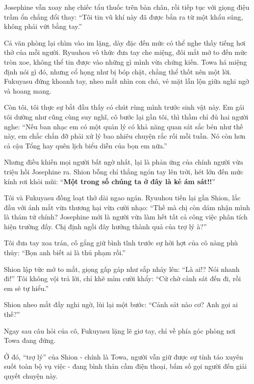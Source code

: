 \documentclass[../main.tex]{subfiles}
\begin{document}
Josephine vẫn xoay nhẹ chiếc tẩu thuốc trên bàn chân, rồi tiếp tục với giọng điệu trầm ổn chẳng đổi thay: ``Tôi tin vũ khí này đã được bắn ra từ một khẩu súng, không phải vứt bằng tay.''

Cả văn phòng lại chìm vào im lặng, dày đặc đến mức có thể nghe thấy tiếng hơi thở của mỗi người. Ryuuhou vô thức đưa tay che miệng, đôi mắt mở to đến mức tròn xoe, không thể tin được vào những gì mình vừa chứng kiến. Towa há miệng định nói gì đó, nhưng cổ họng như bị bóp chặt, chẳng thể thốt nên một lời. Fukuyasu đứng khoanh tay, nheo mắt nhìn con chó, vẻ mặt lẫn lộn giữa nghi ngờ và hoang mang.

Còn tôi, tôi thực sự bắt đầu thấy có chút rùng mình trước sinh vật này. Em gái tôi dường như cũng cùng suy nghĩ, cô bước lại gần tôi, thì thầm chỉ đủ hai người nghe: ``Nếu ban nhạc em có một quản lý có khả năng quan sát sắc bén như thế này, em chắc chắn đỡ phải xử lý bao nhiêu chuyện rắc rối mỗi tuần. Nó còn hơn cả cậu Tổng hay quên lịch biểu diễn của bọn em nữa.''

Nhưng điều khiến mọi người bất ngờ nhất, lại là phản ứng của chính người vừa triệu hồi Josephine ra. Shion bỗng chỉ thẳng ngón tay lên trời, hét lớn đến mức kính rơi khỏi mũi: ``\textbf{Một trong số chúng ta ở đây là kẻ ám sát!!}''

Tôi và Fukuyasu đồng loạt thở dài ngao ngán. Ryuuhou tiến lại gần Shion, lắc đầu với ánh mắt vừa thương hại vừa cười nhạo: ``Thế mà chị còn dám nhận mình là thám tử chính? Josephine mới là người vừa làm hết tất cả công việc phân tích hiện trường đấy. Chị định ngồi đây hưởng thành quả của trợ lý à?''

Tôi đưa tay xoa trán, cố gắng giữ bình tĩnh trước sự hời hợt của cô nàng phù thủy: ``Bọn anh biết ai là thủ phạm rồi.''

Shion lập tức mở to mắt, giọng gấp gáp như sắp nhảy lên: ``Là ai!? Nói nhanh đi!'' Tôi không vội trả lời, chỉ khẽ mỉm cười khẩy: ``Cứ chờ cảnh sát đến đi, rồi em sẽ tự hiểu.''

Shion nheo mắt đầy nghi ngờ, lùi lại một bước: ``Cảnh sát nào cơ? Anh gọi ai thế?''

Ngay sau câu hỏi của cô, Fukuyasu lặng lẽ giơ tay, chỉ về phía góc phòng nơi Towa đang đứng.

Ở đó, ``trợ lý'' của Shion - chính là Towa, người vẫn giữ được sự tỉnh táo xuyên suốt toàn bộ vụ việc - đang bình thản cầm điện thoại, bấm số gọi người đến giải quyết chuyện này.

\end{document}
